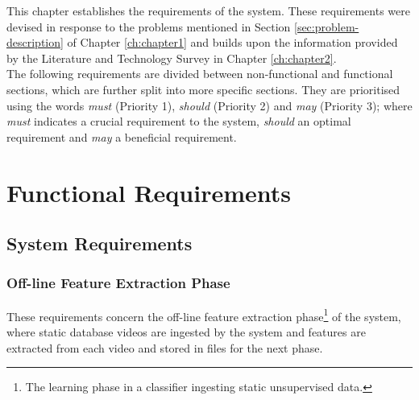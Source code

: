 This chapter establishes the requirements of the system. These requirements were devised in response to the problems mentioned in Section \ref{sec:problem-description} of Chapter \ref{ch:chapter1} and builds upon the information provided by the Literature and Technology Survey in Chapter \ref{ch:chapter2}.\\

The following requirements are divided between non-functional and functional sections, which are further split into more specific sections. They are prioritised using the words \textit{must} (Priority 1), \textit{should} (Priority 2) and \textit{may} (Priority 3); where \textit{must} indicates a crucial requirement to the system, \textit{should} an optimal requirement and \textit{may} a beneficial requirement.

\section{Functional Requirements}

\subsection{System Requirements}

\subsubsection{Off-line Feature Extraction Phase}

These requirements concern the off-line feature extraction phase\footnote{The learning phase in a classifier ingesting static unsupervised data.} of the system, where static database videos are ingested by the system and features are extracted from each video and stored in files for the next phase.

